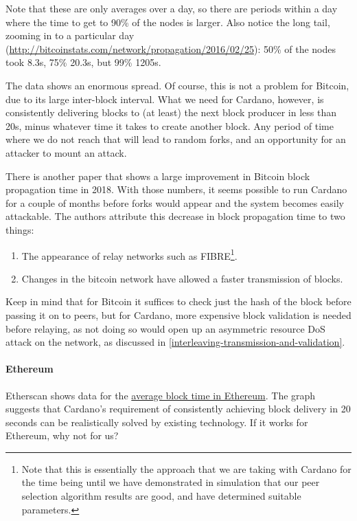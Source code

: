 \documentclass[11pt,a4paper]{article}
\begin{document}
Note that these are only averages over a day, so there are periods
within a day where the time to get to 90\% of the nodes is larger. Also
notice the long tail, zooming in to a particular day
(\href{http://bitcoinstats.com/network/propagation/2016/02/25}{{http://bitcoinstats.com/network/propagation/2016/02/25}}):
50\% of the nodes took 8.3s, 75\% 20.3s, but 99\% 1205s.

The data shows an enormous spread. Of course, this is not a problem for
Bitcoin, due to its large inter-block interval. What we need for
Cardano, however, is consistently delivering blocks to (at least) the
next block producer in less than 20s, minus whatever time it takes to
create another block. Any period of time where we do not reach that will
lead to random forks, and an opportunity for an attacker to mount an
attack.

There is another paper \cite{N18} that shows a large improvement in
Bitcoin block propagation time in 2018. With those numbers, it seems
possible to run Cardano for a couple of months before forks would appear
and the system becomes easily attackable. The authors attribute this
decrease in block propagation time to two things:

\begin{enumerate}
\item
  The appearance of relay networks such as FIBRE\footnote{Note that this
    is essentially the approach that we are taking with Cardano for the
    time being until we have demonstrated in simulation that our peer
    selection algorithm results are good, and have determined suitable
    parameters.}.
\item
  Changes in the bitcoin network have allowed a faster transmission of
  blocks.
\end{enumerate}

Keep in mind that for Bitcoin it suffices to check just the hash of the
block before passing it on to peers, but for Cardano, more expensive
block validation is needed before relaying, as not doing so would open
up an asymmetric resource DoS attack on the network, as discussed in
\cref{interleaving-transmission-and-validation}.

\paragraph{Ethereum}
\label{ethereum}

Etherscan shows data for the
\href{https://etherscan.io/chart/blocktime}{{average block time in
Ethereum}}. The graph suggests that Cardano's requirement of
consistently achieving block delivery in 20 seconds can be realistically
solved by existing technology. If it works for Ethereum, why not for us?
\end{document}
